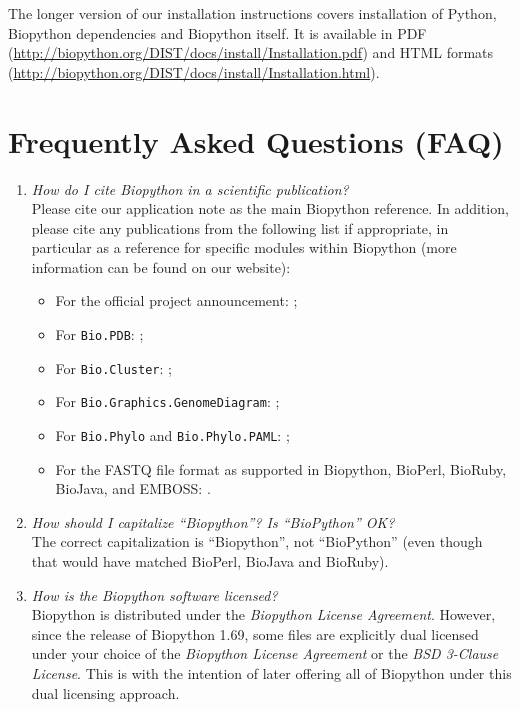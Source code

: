 The longer version of our installation instructions covers
installation of Python, Biopython dependencies and Biopython itself.
It is available in PDF
(\url{http://biopython.org/DIST/docs/install/Installation.pdf})
and HTML formats
(\url{http://biopython.org/DIST/docs/install/Installation.html}).

\section{Frequently Asked Questions (FAQ)}

\begin{enumerate}

  \item \emph{How do I cite Biopython in a scientific publication?} \\
  Please cite our application note \cite[Cock \textit{et al.}, 2009]{cock2009}
  as the main Biopython reference.
  In addition, please cite any publications from the following list if appropriate, in particular as a reference for specific modules within Biopython (more information can be found on our website):
  \begin{itemize}
    \item For the official project announcement: \cite[Chapman and Chang, 2000]{chapman2000};
    \item For \verb+Bio.PDB+: \cite[Hamelryck and Manderick, 2003]{hamelryck2003a};
    \item For \verb+Bio.Cluster+: \cite[De Hoon \textit{et al.}, 2004]{dehoon2004};
    \item For \verb+Bio.Graphics.GenomeDiagram+: \cite[Pritchard \textit{et al.}, 2006]{pritchard2006};
    \item For \verb+Bio.Phylo+ and \verb+Bio.Phylo.PAML+: \cite[Talevich \textit{et al.}, 2012]{talevich2012};
    \item For the FASTQ file format as supported in Biopython, BioPerl, BioRuby, BioJava, and EMBOSS: \cite[Cock \textit{et al.}, 2010]{cock2010}.
  \end{itemize}

  \item \emph{How should I capitalize ``Biopython''?  Is ``BioPython'' OK?} \\
  The correct capitalization is ``Biopython'', not ``BioPython'' (even though
  that would have matched BioPerl, BioJava and BioRuby).

  \item \emph{How is the Biopython software licensed?} \\
  Biopython is distributed under the \emph{Biopython License Agreement}.
  However, since the release of Biopython 1.69, some files are explicitly
  dual licensed under your choice of the \emph{Biopython License Agreement}
  or the \emph{BSD 3-Clause License}. This is with the intention of later
  offering all of Biopython under this dual licensing approach.


\end{enumerate}
